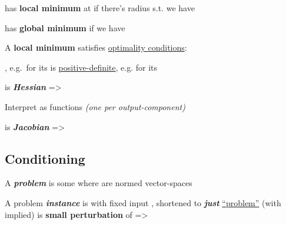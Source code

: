 \hSep %

 has \textbf{local minimum} at  if there's radius 
s.t.  we have 

 has \textbf{global minimum}  if 
we have 

A \textbf{local minimum} satisfies \underline{optimality conditions}:
\begin{itemize}
      \vItem
            , e.g.~for 
            its 
      \vItem
             is \underline{positive-definite},
            e.g. for  its 
\end{itemize}

\hSep %

 is \textbf{\emph{Hessian}} =>

Interpret  as  functions 
\emph{(one per output-component)}
\begin{itemize}
      \vItem
            is \textbf{\emph{Jacobian}} =>
\end{itemize}


\subsection*{Conditioning}

A \textbf{\emph{problem}} is some  where 
are normed vector-spaces

\begin{itemize}

      \vItem
            A problem \textbf{\emph{instance}} is  with fixed input
            , shortened to \textbf{\emph{just}} \underline{``problem''}
            (with  implied)
      \vItem
             is \textbf{small perturbation} of 
            => 
\end{itemize}

